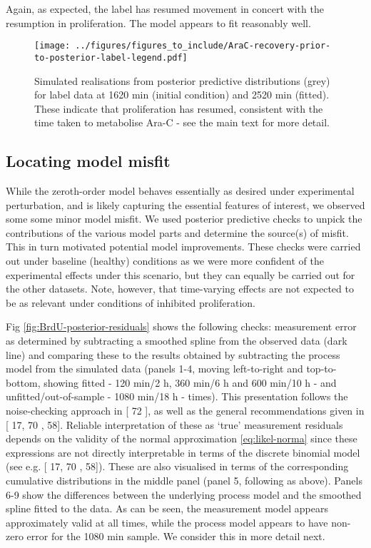 \documentclass[10pt,letterpaper]{article}
\providecommand{\DIFaddtex}[1]{{\protect\color{blue} \sf #1}} %
\providecommand{\DIFdeltex}[1]{{\protect\color{red} \scriptsize #1}} %
\providecommand{\DIFaddbegin}{} %
\providecommand{\DIFaddend}{} %
\providecommand{\DIFdelbegin}{} %
\providecommand{\DIFdelend}{} %
\providecommand{\DIFadd}[1]{\texorpdfstring{\DIFaddtex{#1}}{#1}} %
\providecommand{\DIFdel}[1]{\texorpdfstring{\DIFdeltex{#1}}{}} %
\begin{document}
Again, as expected, the label has resumed movement in concert with the
resumption in proliferation. The model appears to fit reasonably well.

\begin{figure}
\centering
\texttt{[image: ../figures/figures\_to\_include/AraC-recovery-prior-to-posterior-label-legend.pdf]}
\caption{Simulated realisations from posterior predictive distributions
(grey) for label data at 1620 min (initial condition) and 2520 min
(fitted). These indicate that proliferation has resumed, consistent with
the time taken to metabolise Ara-C - see the main text for more
detail.\label{fig:AraC-recovery-posterior-label-all}}
\end{figure}

\subsection{Locating model misfit}\label{locating-model-misfit}

While the zeroth-order model behaves essentially as desired under
experimental perturbation, and is likely capturing the essential
features of interest, we observed some \DIFdelbegin \DIFdel{some }\DIFdelend minor model misfit. We used
posterior predictive checks to unpick the contributions of the various
model parts and determine the source(s) of misfit. This in turn
motivated potential model improvements. These checks were carried out
under baseline (healthy) conditions as we were more confident of the
experimental effects under this scenario, but they can equally be
carried out for the other datasets. Note, however, that time-varying
effects are not expected to be as relevant under conditions of inhibited
proliferation.

Fig \ref{fig:BrdU-posterior-residuals} shows the following checks:
measurement error as determined by subtracting a smoothed spline from
the observed data (dark line) and comparing these to the results
obtained by subtracting the process model from the simulated data
(panels 1-4, moving left-to-right and top-to-bottom, showing fitted -
120 min/2 h, 360 min/6 h and 600 min/10 h - and unfitted/out-of-sample -
1080 min/18 h - times). This presentation follows the noise-checking
approach in {[}\DIFdelbegin \DIFdel{72}\DIFdelend \DIFaddbegin \DIFadd{60}\DIFaddend {]}, as well as the general recommendations given in
{[}\DIFdelbegin \DIFdel{17, 70}\DIFdelend \DIFaddbegin \DIFadd{20, 58}\DIFaddend {]}. Reliable interpretation of these as `true' measurement
residuals depends on the validity of the normal approximation
\ref{eq:likel-norma} since these expressions are not directly
interpretable in terms of the discrete binomial model (see e.g. {[}\DIFdelbegin \DIFdel{17,
70}\DIFdelend \DIFaddbegin \DIFadd{20,
58}\DIFaddend {]}). These are also visualised in terms of the corresponding
cumulative distributions in the middle panel (panel 5, following as
above). Panels 6-9 show the differences between the underlying process
model and the smoothed spline fitted to the data. As can be seen, the
measurement model appears approximately valid at all times, while the
process model appears to have non-zero error for the 1080 min sample. We
consider this in more detail next.
\end{document}
